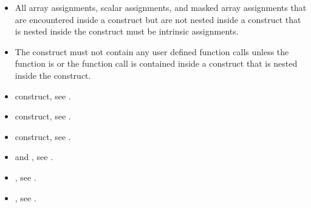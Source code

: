 \begin{fortranspecific}
\begin{itemize}
\item All array assignments, scalar assignments, and masked array assignments 
      that are encountered inside a  construct but are not nested
      inside a  construct that is nested inside the 
      construct must be intrinsic assignments.
\item The construct must not contain any user defined function calls unless the 
      function is  or the function call is contained inside a 
       construct that is nested inside the  construct.
\end{itemize}

\crossreferences
\begin{itemize}
\item {} construct, see .

\item {} construct, see .

\item {} construct, see .

\item {} and , see
.

\item {}, see .

\item {}, see
.
\end{itemize}

\end{fortranspecific}
